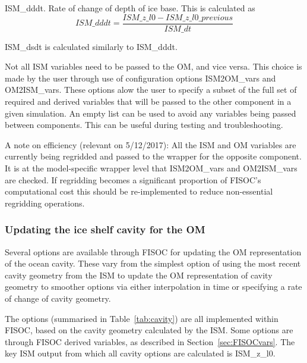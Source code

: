 \documentclass[11pt]{article}
\begin{document}
ISM\_dddt.  Rate of change of depth of ice base.  This is calculated as 
\begin{equation}
ISM\_dddt = \frac{ISM\_z\_l0 - ISM\_z\_l0\_previous}{ISM\_dt}
\end{equation}

ISM\_dsdt is calculated similarly to ISM\_dddt.

Not all ISM variables need to be passed to the OM, and vice versa.  
This choice is made by the 
user through use of configuration options ISM2OM\_vars and OM2ISM\_vars.  
These options alow the user to specify a subset of the full set of 
required and derived variables that will be passed to the other component 
in a given simulation.  An empty list can be used to avoid any variables 
being passed between components.  This can be useful during testing and 
troubleshooting.

A note on efficiency (relevant on 5/12/2017): 
All the ISM and OM variables are currently being regridded and passed 
to the wrapper for the opposite component.  It is at the model-specific 
wrapper level that ISM2OM\_vars and OM2ISM\_vars are checked.  If regridding 
becomes a significant proportion of FISOC's computational cost this 
should be re-implemented to reduce non-essential regridding operations.





\subsubsection{Updating the ice shelf cavity for the OM}

Several options are available through FISOC for updating the OM representation 
of the ocean cavity. 
These vary from the simplest option of using 
the most recent cavity geometry from the ISM to update the OM representation of 
cavity geometry to smoother options via either interpolation in time or 
specifying a rate of change of cavity geometry.

The options (summarised in Table~\ref{tab:cavity}) are all implemented 
within FISOC, based on the cavity geometry 
calculated by the ISM.  
Some options are through FISOC derived variables, as described 
in Section~\ref{sec:FISOCvars}.  
The key ISM output from which all cavity options 
are calculated is ISM\_z\_l0.  
\end{document}
